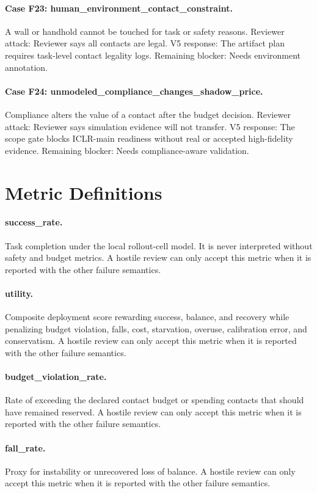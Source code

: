\documentclass{article}
\begin{document}
\paragraph{Case F23: human\_environment\_contact\_constraint.} A wall or handhold cannot be touched for task or safety reasons. Reviewer attack: Reviewer says all contacts are legal. V5 response: The artifact plan requires task-level contact legality logs. Remaining blocker: Needs environment annotation.
\paragraph{Case F24: unmodeled\_compliance\_changes\_shadow\_price.} Compliance alters the value of a contact after the budget decision. Reviewer attack: Reviewer says simulation evidence will not transfer. V5 response: The scope gate blocks ICLR-main readiness without real or accepted high-fidelity evidence. Remaining blocker: Needs compliance-aware validation.
\clearpage
\section{Metric Definitions}
\paragraph{success\_rate.} Task completion under the local rollout-cell model. It is never interpreted without safety and budget metrics. A hostile review can only accept this metric when it is reported with the other failure semantics.
\paragraph{utility.} Composite deployment score rewarding success, balance, and recovery while penalizing budget violation, falls, cost, starvation, overuse, calibration error, and conservatism. A hostile review can only accept this metric when it is reported with the other failure semantics.
\paragraph{budget\_violation\_rate.} Rate of exceeding the declared contact budget or spending contacts that should have remained reserved. A hostile review can only accept this metric when it is reported with the other failure semantics.
\paragraph{fall\_rate.} Proxy for instability or unrecovered loss of balance. A hostile review can only accept this metric when it is reported with the other failure semantics.
\end{document}
